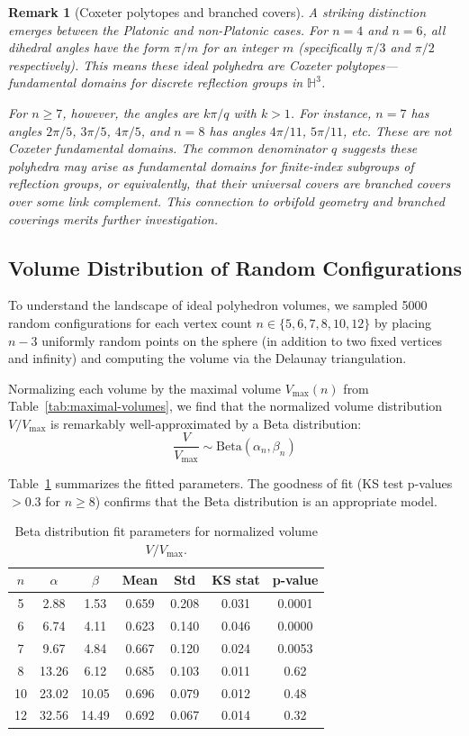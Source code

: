 \documentclass[11pt]{article}
\newtheorem{remark}{Remark}
\begin{document}
\begin{remark}[Coxeter polytopes and branched covers]
A striking distinction emerges between the Platonic and non-Platonic cases. For $n=4$ and $n=6$, \emph{all} dihedral angles have the form $\pi/m$ for an integer $m$ (specifically $\pi/3$ and $\pi/2$ respectively). This means these ideal polyhedra are \emph{Coxeter polytopes}---fundamental domains for discrete reflection groups in $\mathbb{H}^3$.

For $n \geq 7$, however, the angles are $k\pi/q$ with $k > 1$. For instance, $n=7$ has angles $2\pi/5$, $3\pi/5$, $4\pi/5$, and $n=8$ has angles $4\pi/11$, $5\pi/11$, etc. These are \emph{not} Coxeter fundamental domains. The common denominator $q$ suggests these polyhedra may arise as fundamental domains for finite-index subgroups of reflection groups, or equivalently, that their universal covers are branched covers over some link complement. This connection to orbifold geometry and branched coverings merits further investigation.
\end{remark}

\subsection{Volume Distribution of Random Configurations}

To understand the landscape of ideal polyhedron volumes, we sampled 5000 random configurations for each vertex count $n \in \{5, 6, 7, 8, 10, 12\}$ by placing $n-3$ uniformly random points on the sphere (in addition to two fixed vertices and infinity) and computing the volume via the Delaunay triangulation.

Normalizing each volume by the maximal volume $V_{\max}(n)$ from Table~\ref{tab:maximal-volumes}, we find that the normalized volume distribution $V/V_{\max}$ is remarkably well-approximated by a Beta distribution:
\[
\frac{V}{V_{\max}} \sim \mathrm{Beta}(\alpha_n, \beta_n)
\]

Table~\ref{tab:beta-fits} summarizes the fitted parameters. The goodness of fit (KS test p-values $> 0.3$ for $n \geq 8$) confirms that the Beta distribution is an appropriate model.

\begin{table}[htbp]
\centering
\caption{Beta distribution fit parameters for normalized volume $V/V_{\max}$.}
\label{tab:beta-fits}
\begin{tabular}{ccccccc}
\toprule
$n$ & $\alpha$ & $\beta$ & Mean & Std & KS stat & p-value \\
\midrule
5  & 2.88  & 1.53  & 0.659 & 0.208 & 0.031 & 0.0001 \\
6  & 6.74  & 4.11  & 0.623 & 0.140 & 0.046 & 0.0000 \\
7  & 9.67  & 4.84  & 0.667 & 0.120 & 0.024 & 0.0053 \\
8  & 13.26 & 6.12  & 0.685 & 0.103 & 0.011 & 0.62 \\
10 & 23.02 & 10.05 & 0.696 & 0.079 & 0.012 & 0.48 \\
12 & 32.56 & 14.49 & 0.692 & 0.067 & 0.014 & 0.32 \\
\bottomrule
\end{tabular}
\end{table}
\end{document}
